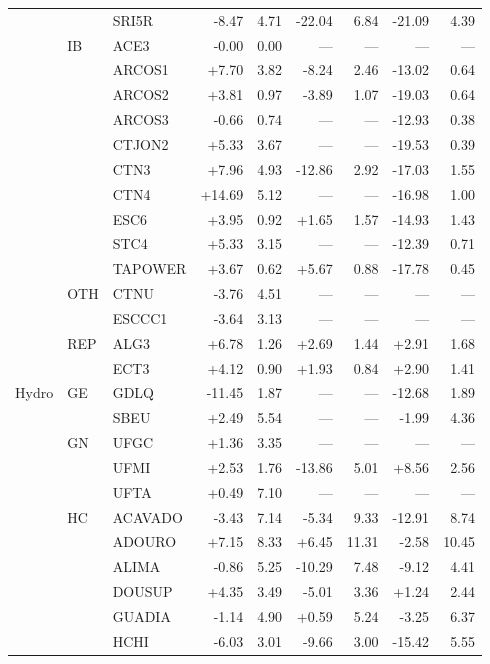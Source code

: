 \begin{tabular}{l l l r r r r r r}
 &  & SRI5R & -8.47 & 4.71 & -22.04 & 6.84 & -21.09 & 4.39 \\
 & IB & ACE3 & -0.00 & 0.00 & --- & --- & --- & --- \\
 &  & ARCOS1 & +7.70 & 3.82 & -8.24 & 2.46 & -13.02 & 0.64 \\
 &  & ARCOS2 & +3.81 & 0.97 & -3.89 & 1.07 & -19.03 & 0.64 \\
 &  & ARCOS3 & -0.66 & 0.74 & --- & --- & -12.93 & 0.38 \\
 &  & CTJON2 & +5.33 & 3.67 & --- & --- & -19.53 & 0.39 \\
 &  & CTN3 & +7.96 & 4.93 & -12.86 & 2.92 & -17.03 & 1.55 \\
 &  & CTN4 & +14.69 & 5.12 & --- & --- & -16.98 & 1.00 \\
 &  & ESC6 & +3.95 & 0.92 & +1.65 & 1.57 & -14.93 & 1.43 \\
 &  & STC4 & +5.33 & 3.15 & --- & --- & -12.39 & 0.71 \\
 &  & TAPOWER & +3.67 & 0.62 & +5.67 & 0.88 & -17.78 & 0.45 \\
 & OTH & CTNU & -3.76 & 4.51 & --- & --- & --- & --- \\
 &  & ESCCC1 & -3.64 & 3.13 & --- & --- & --- & --- \\
 & REP & ALG3 & +6.78 & 1.26 & +2.69 & 1.44 & +2.91 & 1.68 \\
 &  & ECT3 & +4.12 & 0.90 & +1.93 & 0.84 & +2.90 & 1.41 \\
\addlinespace
Hydro & GE & GDLQ & -11.45 & 1.87 & --- & --- & -12.68 & 1.89 \\
 &  & SBEU & +2.49 & 5.54 & --- & --- & -1.99 & 4.36 \\
 & GN & UFGC & +1.36 & 3.35 & --- & --- & --- & --- \\
 &  & UFMI & +2.53 & 1.76 & -13.86 & 5.01 & +8.56 & 2.56 \\
 &  & UFTA & +0.49 & 7.10 & --- & --- & --- & --- \\
 & HC & ACAVADO & -3.43 & 7.14 & -5.34 & 9.33 & -12.91 & 8.74 \\
 &  & ADOURO & +7.15 & 8.33 & +6.45 & 11.31 & -2.58 & 10.45 \\
 &  & ALIMA & -0.86 & 5.25 & -10.29 & 7.48 & -9.12 & 4.41 \\
 &  & DOUSUP & +4.35 & 3.49 & -5.01 & 3.36 & +1.24 & 2.44 \\
 &  & GUADIA & -1.14 & 4.90 & +0.59 & 5.24 & -3.25 & 6.37 \\
 &  & HCHI & -6.03 & 3.01 & -9.66 & 3.00 & -15.42 & 5.55 \\

\end{tabular}
